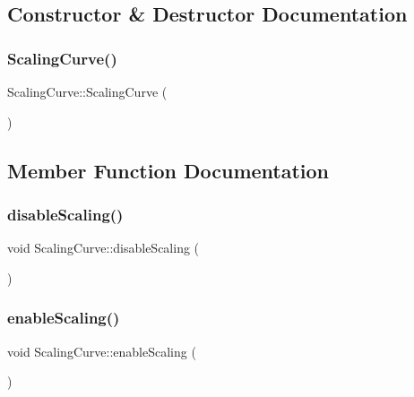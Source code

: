 \subsection{Constructor \& Destructor Documentation}
\mbox{\label{classScalingCurve_ab0b52e98eecd1c1ce1ff888dc710ebbc}} 
\subsubsection{\texorpdfstring{Scaling\+Curve()}{ScalingCurve()}}
{\footnotesize\ttfamily Scaling\+Curve\+::\+Scaling\+Curve (\begin{DoxyParamCaption}{ }\end{DoxyParamCaption})}



\subsection{Member Function Documentation}
\mbox{\label{classScalingCurve_a688204d455d320f7ac5435c60e815772}} 
\subsubsection{\texorpdfstring{disable\+Scaling()}{disableScaling()}}
{\footnotesize\ttfamily void Scaling\+Curve\+::disable\+Scaling (\begin{DoxyParamCaption}{ }\end{DoxyParamCaption})}

\mbox{\label{classScalingCurve_a902a8b226db6f165874875d84cdefef5}} 
\subsubsection{\texorpdfstring{enable\+Scaling()}{enableScaling()}}
{\footnotesize\ttfamily void Scaling\+Curve\+::enable\+Scaling (\begin{DoxyParamCaption}{ }\end{DoxyParamCaption})}


